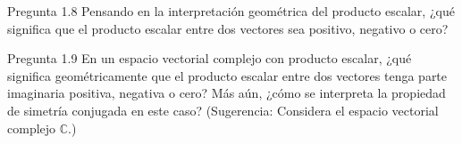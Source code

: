 \documentclass[12pt,dvipsnames]{article}
\numberwithin{equation}{section}
\begin{document}
Pregunta 1.8 Pensando en la interpretación geométrica del producto escalar, ¿qué significa que el producto escalar entre dos vectores sea positivo, negativo o cero? 

Pregunta 1.9 En un espacio vectorial complejo con producto escalar, ¿qué significa geométricamente que el producto escalar entre dos vectores tenga parte imaginaria positiva, negativa o cero? Más aún, ¿cómo se interpreta la propiedad de simetría conjugada en este caso? (Sugerencia: Considera el espacio vectorial complejo $\mathbb{C}$.) \\ 
\end{document}
